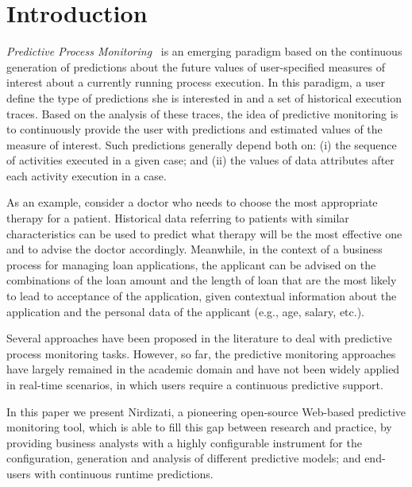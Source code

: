 \documentclass[runningheads,a4paper]{llncs}
\begin{document}
\section{Introduction} \label{sec:intro}
\emph{Predictive Process Monitoring}~\cite{PredictiveMonitoring} is an emerging paradigm based on the continuous generation of predictions about the future values of user-specified measures of interest about a currently running process execution.
In this paradigm, a user define the type of predictions she is interested in and a set of historical execution traces. Based on the analysis of these traces, the idea of predictive monitoring is to continuously provide the user with predictions and estimated values of the measure of interest. Such predictions generally depend both on: (i) the sequence of activities executed in a given case; and (ii) the values of data attributes after each activity execution in a case.

As an example, consider a doctor who needs to choose the most appropriate therapy for a patient. Historical data referring to patients with similar characteristics can be used to predict what therapy will be the most effective one and to advise the doctor accordingly. Meanwhile, in the context of a business process for managing loan applications, the applicant can be advised on the combinations of the loan amount and the length of loan that are the most likely to lead to acceptance of the application, given contextual information about the application and the personal data of the applicant (e.g., age, salary, etc.).

Several approaches have been proposed in the literature to deal with predictive process monitoring tasks.
However, so far, the predictive monitoring approaches have largely remained in the academic domain and
have not been widely applied in real-time scenarios, in which users require a continuous predictive support.

In this paper we present Nirdizati, a pioneering open-source Web-based predictive monitoring tool, which is able to fill this gap
between research and practice, by providing business analysts with a highly configurable instrument for the configuration,
generation and analysis of different predictive models; and end-users with continuous runtime predictions.
\end{document}

